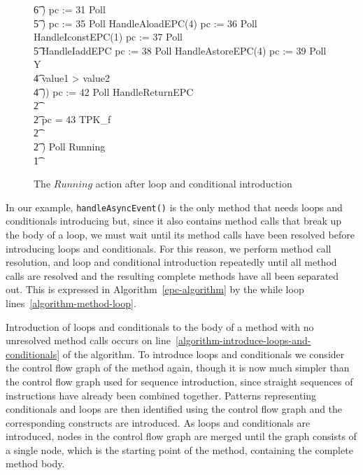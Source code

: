 \begin{figure}[tp!]
{\begin{circus}
    \t6 \circfi) \circseq pc := 31 \circseq Poll \\
    \t5 \circfi) \circseq pc := 35 \circseq Poll \circseq HandleAloadEPC(4) \circseq pc := 36 \circseq Poll \circseq HandleIconstEPC(1) \circseq pc := 37 \circseq Poll \circseq \\
    \t5 HandleIaddEPC \circseq pc := 38 \circseq Poll \circseq HandleAstoreEPC(4) \circseq pc := 39 \circseq Poll \circseq Y \\
    \t4 {} \circelse value1 > value2 \circthen \Skip \\
    \t4 \circfi)) \circseq pc := 42 \circseq Poll \circseq HandleReturnEPC \\
    \t2 {} \cdots {} \\
    \t2 {} \circelse pc = 43 \circthen TPK\_f \\
    \t2 {} \cdots {} \\
    \t2 \circfi) \circseq Poll \circseq Running \\
    \t1 \circfi
  \end{circus}
  }
  \caption{The $Running$ action after loop and conditional introduction}
  \label{loop-and-conditional-introduction-example-figure}
\end{figure}

In our example, \texttt{handleAsyncEvent()} is the only method that
needs loops and conditionals introducing but, since it also contains
method calls that break up the body of a loop, we must wait until its
method calls have been resolved before introducing loops and
conditionals.
For this reason, we perform method call resolution, and loop and
conditional introduction repeatedly until all method calls are
resolved and the resulting complete methods have all been separated
out.
This is expressed in Algorithm~\ref{epc-algorithm} by the while
loop lines~\ref{algorithm-method-loop}.

Introduction of loops and conditionals to the body of a method with no
unresolved method calls occurs on
line~\ref{algorithm-introduce-loops-and-conditionals} of the
algorithm.
To introduce loops and conditionals we consider the control flow graph
of the method again, though it is now much simpler than the control
flow graph used for sequence introduction, since straight sequences of
instructions have already been combined together.
Patterns representing conditionals and loops are then identified using
the control flow graph and the corresponding constructs are
introduced.
As loops and conditionals are introduced, nodes in the control flow
graph are merged until the graph consists of a single node, which is
the starting point of the method, containing the complete method body.

